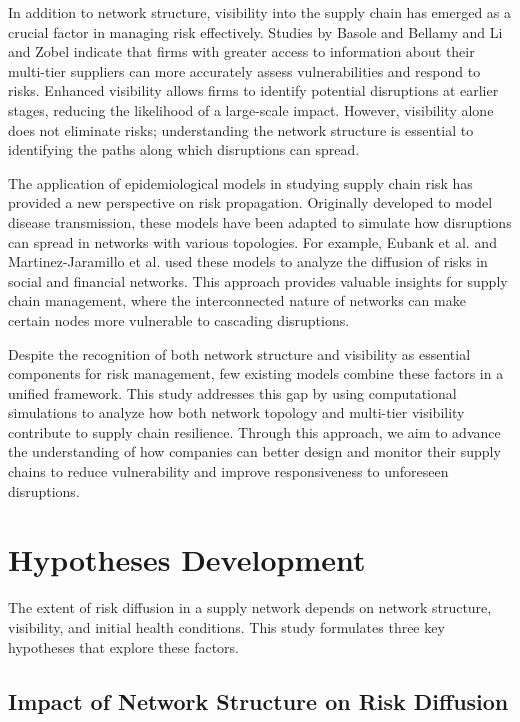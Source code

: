 \documentclass{article}
\begin{document}
In addition to network structure, visibility into the supply chain has emerged as a crucial factor in managing risk effectively. Studies by Basole and Bellamy \cite{Basole2016} and Li and Zobel \cite{Li2013} indicate that firms with greater access to information about their multi-tier suppliers can more accurately assess vulnerabilities and respond to risks. Enhanced visibility allows firms to identify potential disruptions at earlier stages, reducing the likelihood of a large-scale impact. However, visibility alone does not eliminate risks; understanding the network structure is essential to identifying the paths along which disruptions can spread.

The application of epidemiological models in studying supply chain risk has provided a new perspective on risk propagation. Originally developed to model disease transmission, these models have been adapted to simulate how disruptions can spread in networks with various topologies. For example, Eubank et al. \cite{Eubank2004} and Martinez-Jaramillo et al. \cite{Martinez2010} used these models to analyze the diffusion of risks in social and financial networks. This approach provides valuable insights for supply chain management, where the interconnected nature of networks can make certain nodes more vulnerable to cascading disruptions.

Despite the recognition of both network structure and visibility as essential components for risk management, few existing models combine these factors in a unified framework. This study addresses this gap by using computational simulations to analyze how both network topology and multi-tier visibility contribute to supply chain resilience. Through this approach, we aim to advance the understanding of how companies can better design and monitor their supply chains to reduce vulnerability and improve responsiveness to unforeseen disruptions.
\section{Hypotheses Development}

The extent of risk diffusion in a supply network depends on network structure, visibility, and initial health conditions. This study formulates three key hypotheses that explore these factors.

\subsection{Impact of Network Structure on Risk Diffusion}
\end{document}
